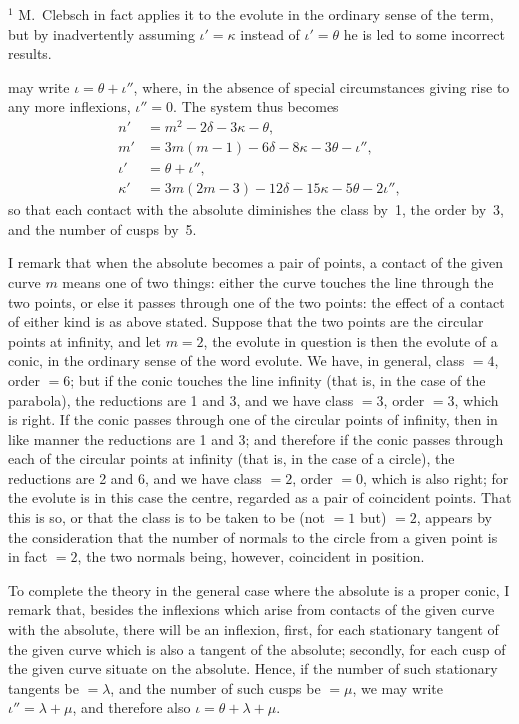 \documentclass[11pt]{article}
\begin{document}
\medskip
\footnoterule
\noindent\footnotesize ${}^{1}$ M.~Clebsch in fact applies it to the evolute in the ordinary sense of the term, but by inadvertently assuming $\iota' = \kappa$ instead of $\iota' = \theta$ he is led to some incorrect results.

\newpage

\noindent\normalsize may write $\iota = \theta + \iota''$, where, in the absence of special circumstances giving rise to any more inflexions, $\iota''=0$. The system thus becomes
\begin{align*}
n' &= m^{2} - 2\delta - 3\kappa - \theta,\\
m' &= 3m(m-1) - 6\delta - 8\kappa - 3\theta - \iota'',\\
\iota' &= \theta + \iota'',\\
\kappa' &= 3m(2m-3) - 12\delta - 15\kappa - 5\theta - 2\iota'',
\end{align*}
so that each contact with the absolute diminishes the class by~1, the order by~3, and the number of cusps by~5.

I remark that when the absolute becomes a pair of points, a contact of the given curve $m$ means one of two things: either the curve touches the line through the two points, or else it passes through one of the two points: the effect of a contact of either kind is as above stated. Suppose that the two points are the circular points at infinity, and let $m=2$, the evolute in question is then the evolute of a conic, in the ordinary sense of the word evolute. We have, in general, class $=4$, order $=6$; but if the conic touches the line infinity (that is, in the case of the parabola), the reductions are 1 and 3, and we have class $=3$, order $=3$, which is right. If the conic passes through one of the circular points of infinity, then in like manner the reductions are 1 and 3; and therefore if the conic passes through each of the circular points at infinity (that is, in the case of a circle), the reductions are 2 and 6, and we have class $=2$, order $=0$, which is also right; for the evolute is in this case the centre, regarded as a pair of coincident points. That this is so, or that the class is to be taken to be (not $=1$ but) $=2$, appears by the consideration that the number of normals to the circle from a given point is in fact $=2$, the two normals being, however, coincident in position.

To complete the theory in the general case where the absolute is a proper conic, I remark that, besides the inflexions which arise from contacts of the given curve with the absolute, there will be an inflexion, first, for each stationary tangent of the given curve which is also a tangent of the absolute; secondly, for each cusp of the given curve situate on the absolute. Hence, if the number of such stationary tangents be $=\lambda$, and the number of such cusps be $=\mu$, we may write $\iota'' = \lambda + \mu$, and therefore also $\iota = \theta + \lambda + \mu$.
\end{document}
